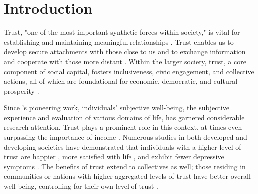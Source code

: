 \section{Introduction}
\label{sec:ch4-introduction}

Trust, "one of the most important synthetic forces within society," is vital for establishing and maintaining meaningful relationships \parencite[p.~326]{simmelSociologyGeorgSimmel1964}. Trust enables us to develop secure attachments with those close to us and to exchange information and cooperate with those more distant \parencite{rusbultCommitmentTrustClose1999,schilkeTrustSocialRelations2021,simpsonFoundationsInterpersonalTrust2007}. Within the larger society, trust, a core component of social capital, fosters inclusiveness, civic engagement, and collective actions, all of which are foundational for economic, democratic, and cultural prosperity \parencite{fukuyamaTrustSocialVirtues1996,fukuyamaSocialCapitalCivil2001,putnamBowlingAloneCollapse2001}.

Since \citeauthor{easterlinDoesEconomicGrowth1974}'s \citeyear{easterlinDoesEconomicGrowth1974} pioneering work, individuals' subjective well-being, the subjective experience and evaluation of various domains of life, has garnered considerable research attention. Trust plays a prominent role in this context, at times even surpassing the importance of income \parencite{bjornskovHappyFewCross2003,helliwellHowsLifeCombining2003}. Numerous studies in both developed and developing societies have demonstrated that individuals with a higher level of trust are happier \parencite{luLongitudinalEvidenceSocial2019,rodriguez-poseSocialCapitalIndividual2013}, more satisfied with life \parencite{zhangSocialTrustSatisfaction2020}, and exhibit fewer depressive symptoms \parencite{fahmiDoesYourNeighborhood2019,fujiwaraProspectiveStudyIndividuallevel2008}. The benefits of trust extend to collectives as well; those residing in communities or nations with higher aggregated levels of trust have better overall well-being, controlling for their own level of trust \parencite{helliwellHowsLifeCombining2003,tovWellBeingNationsLinking2009}.

